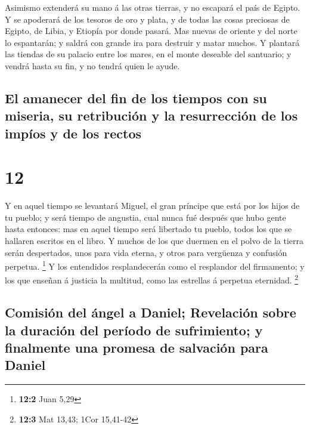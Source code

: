  Asimismo extenderá su mano á las otras tierras, y no
escapará el país de Egipto.  Y se apoderará de los tesoros
de oro y plata, y de todas las cosas preciosas de Egipto, de Libia, y
Etiopía por donde pasará.  Mas nuevas de oriente y del
norte lo espantarán; y saldrá con grande ira para destruir y matar
muchos.  Y plantará las tiendas de su palacio entre los
mares, en el monte deseable del santuario; y vendrá hasta su fin, y no
tendrá quien le ayude.

\hypertarget{el-amanecer-del-fin-de-los-tiempos-con-su-miseria-su-retribuciuxf3n-y-la-resurrecciuxf3n-de-los-impuxedos-y-de-los-rectos}{%
\subsection{El amanecer del fin de los tiempos con su miseria, su
retribución y la resurrección de los impíos y de los
rectos}\label{el-amanecer-del-fin-de-los-tiempos-con-su-miseria-su-retribuciuxf3n-y-la-resurrecciuxf3n-de-los-impuxedos-y-de-los-rectos}}

\hypertarget{section-11}{%
\section{12}\label{section-11}}

 Y en aquel tiempo se levantará Miguel, el gran príncipe que
está por los hijos de tu pueblo; y será tiempo de angustia, cual nunca
fué después que hubo gente hasta entonces: mas en aquel tiempo será
libertado tu pueblo, todos los que se hallaren escritos en el libro.
 Y muchos de los que duermen en el polvo de la tierra serán
despertados, unos para vida eterna, y otros para vergüenza y confusión
perpetua. \footnote{\textbf{12:2} Juan 5,29}  Y los
entendidos resplandecerán como el resplandor del firmamento; y los que
enseñan á justicia la multitud, como las estrellas á perpetua eternidad.
\footnote{\textbf{12:3} Mat 13,43; 1Cor 15,41-42}

\hypertarget{comisiuxf3n-del-uxe1ngel-a-daniel-revelaciuxf3n-sobre-la-duraciuxf3n-del-peruxedodo-de-sufrimiento-y-finalmente-una-promesa-de-salvaciuxf3n-para-daniel}{%
\subsection{Comisión del ángel a Daniel; Revelación sobre la duración
del período de sufrimiento; y finalmente una promesa de salvación para
Daniel}\label{comisiuxf3n-del-uxe1ngel-a-daniel-revelaciuxf3n-sobre-la-duraciuxf3n-del-peruxedodo-de-sufrimiento-y-finalmente-una-promesa-de-salvaciuxf3n-para-daniel}}

